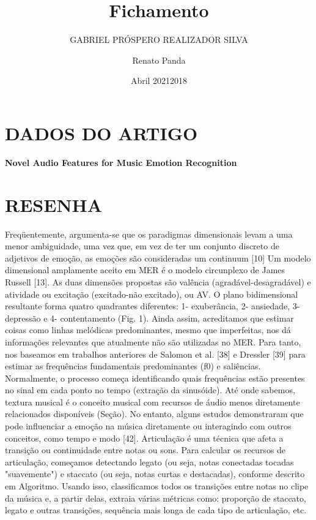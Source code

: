 \documentclass{article}
\title{Fichamento}
\author{GABRIEL PRÓSPERO REALIZADOR  SILVA}
\date{Abril 2021}
\begin{document}
\maketitle

\section{DADOS DO ARTIGO}
\textbf{Novel Audio Features for Music Emotion Recognition \\}
\author{Renato Panda \\}
\date{2018}

\section{RESENHA}
Freqüentemente, argumenta-se que os paradigmas dimensionais levam a uma menor ambiguidade, uma vez que, em vez de ter um conjunto discreto de adjetivos de emoção, as emoções são consideradas um continuum [10] Um modelo dimensional amplamente aceito em MER é o modelo circunplexo de James Russell [13].
As duas dimensões propostas são valência (agradável-desagradável) e atividade ou excitação (excitado-não excitado), ou AV. O plano bidimensional resultante forma quatro quadrantes diferentes: 1- exuberância, 2- ansiedade, 3- depressão e 4- contentamento (Fig. 1).
Ainda assim, acreditamos que estimar coisas como linhas melódicas predominantes, mesmo que imperfeitas, nos dá informações relevantes que atualmente não são utilizadas no MER. Para tanto, nos baseamos em trabalhos anteriores de Salomon et al. [38] e Dressler [39] para estimar as frequências fundamentais predominantes (f0) e saliências. Normalmente, o processo começa identificando quais frequências estão presentes no sinal em cada ponto no tempo (extração da sinusóide).
Até onde sabemos, textura musical é o conceito musical com recursos de áudio menos diretamente relacionados disponíveis (Seção). No entanto, alguns estudos demonstraram que pode influenciar a emoção na música diretamente ou interagindo com outros conceitos, como tempo e modo [42]. 
Articulação é uma técnica que afeta a transição ou continuidade entre notas ou sons. Para calcular os recursos de articulação, começamos detectando legato (ou seja, notas conectadas tocadas "suavemente") e staccato (ou seja, notas curtas e destacadas), conforme descrito em Algoritmo. Usando isso, classificamos todos os
transições entre notas no clipe da música e, a partir delas, extraia várias métricas como: proporção de staccato, legato e outras transições, sequência mais longa de cada tipo de articulação, etc.
\end{document}
